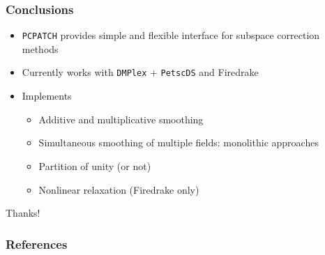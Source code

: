 \documentclass[presentation,aspectratio=43, 10pt]{beamer}
\begin{document}
\begin{frame}
  \frametitle{Conclusions}
  \begin{itemize}
  \item \texttt{PCPATCH} provides simple and flexible interface for
    subspace correction methods
  \item Currently works with \texttt{DMPlex} + \texttt{PetscDS} and
    Firedrake
  \item Implements
    \begin{itemize}
    \item Additive and multiplicative smoothing
    \item Simultaneous smoothing of multiple fields: monolithic
      approaches
    \item Partition of unity (or not)
    \item Nonlinear relaxation (Firedrake only)
    \end{itemize}
  \end{itemize}

  \begin{center}
    Thanks!
  \end{center}
\end{frame}

\appendix
\begin{frame}
  \frametitle{References}
  \printbibliography[heading=none]
\end{frame}
\end{document}
